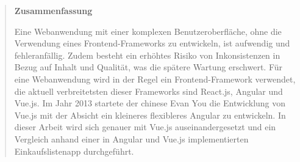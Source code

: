 \documentclass[%
    BCOR=8.25mm,         %
    DIV=12,              %
    parskip=half,                 %
    bibliography=totoc,     %
    headsepline=on,      %
]{scrbook}
\begin{document}
    \pagestyle{empty}
    \begin{quote}
        \vspace*{4cm}

        \begin{center}
            \textbf{\Large\sffamily Zusammenfassung}
        \end{center}
        Eine Webanwendung mit einer komplexen Benutzeroberfläche, ohne die Verwendung eines Frontend-Frameworks zu entwickeln, ist aufwendig und fehleranfällig.
        Zudem besteht ein erhöhtes Risiko von Inkonsistenzen in Bezug auf Inhalt und Qualität, was die spätere Wartung erschwert.
        Für eine Webanwendung wird in der Regel ein Frontend-Framework verwendet, die aktuell verbreitetsten dieser Frameworks sind React.js, Angular und Vue.js.
        Im Jahr 2013 startete der chinese Evan You die Entwicklung von Vue.js mit der Absicht ein kleineres flexibleres Angular zu entwickeln.
        In dieser Arbeit wird sich genauer mit Vue.js auseinandergesetzt und ein Vergleich anhand einer in Angular und Vue.js implementierten Einkaufslistenapp durchgeführt.
    \end{quote}
    \cleardoubleemptypage

    \tableofcontents

    \listoffigures
    \lstlistoflistings

    \mainmatter
    \pagestyle{headings}
    
    
    
    
    
    
%
%
%

    \backmatter

    \appendix
%
    
    
\end{document}
